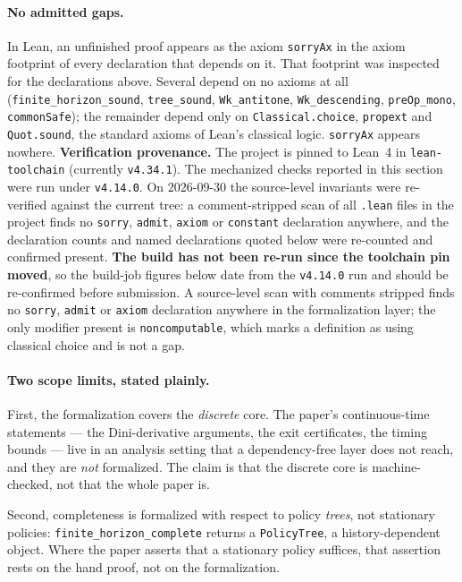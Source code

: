 \documentclass[10pt,twocolumn]{article}
\theoremstyle{definition}
\begin{document}
\paragraph{No admitted gaps.} In Lean, an unfinished proof appears as the axiom
\texttt{sorryAx} in the axiom footprint of every declaration that depends on it. That
footprint was inspected for the declarations above. Several depend on no axioms at all
(\texttt{finite\_horizon\_sound}, \texttt{tree\_sound}, \texttt{Wk\_antitone},
\texttt{Wk\_descending}, \texttt{preOp\_mono}, \texttt{commonSafe}); the remainder depend
only on \texttt{Classical.choice}, \texttt{propext} and \texttt{Quot.sound}, the standard
axioms of Lean's classical logic. \texttt{sorryAx} appears nowhere.
\noindent\textbf{Verification provenance.} The project is pinned to Lean~4 in
\texttt{lean-toolchain} (currently \texttt{v4.34.1}). The mechanized checks reported in this
section were run under \texttt{v4.14.0}. On 2026-09-30 the source-level invariants were
re-verified against the current tree: a comment-stripped scan of all \texttt{.lean} files in
the project finds no \texttt{sorry}, \texttt{admit}, \texttt{axiom} or \texttt{constant}
declaration anywhere, and the declaration counts and named declarations quoted below were
re-counted and confirmed present. \textbf{The build has not been re-run since the toolchain
pin moved}, so the build-job figures below date from the \texttt{v4.14.0} run and should be
re-confirmed before submission.
 A source-level scan
with comments stripped finds no \texttt{sorry}, \texttt{admit} or \texttt{axiom}
declaration anywhere in the formalization layer; the only modifier present is
\texttt{noncomputable}, which marks a definition as using classical choice and is not a
gap.

\paragraph{Two scope limits, stated plainly.}

First, the formalization covers the \emph{discrete} core. The paper's continuous-time
statements --- the Dini-derivative arguments, the exit certificates, the timing bounds
--- live in an analysis setting that a dependency-free layer does not reach, and they are
\emph{not} formalized. The claim is that the discrete core is machine-checked, not that
the whole paper is.

Second, completeness is formalized with respect to policy \emph{trees}, not stationary
policies: \texttt{finite\_horizon\_complete} returns a \texttt{PolicyTree}, a
history-dependent object. Where the paper asserts that a stationary policy suffices,
that assertion rests on the hand proof, not on the formalization.
\end{document}
